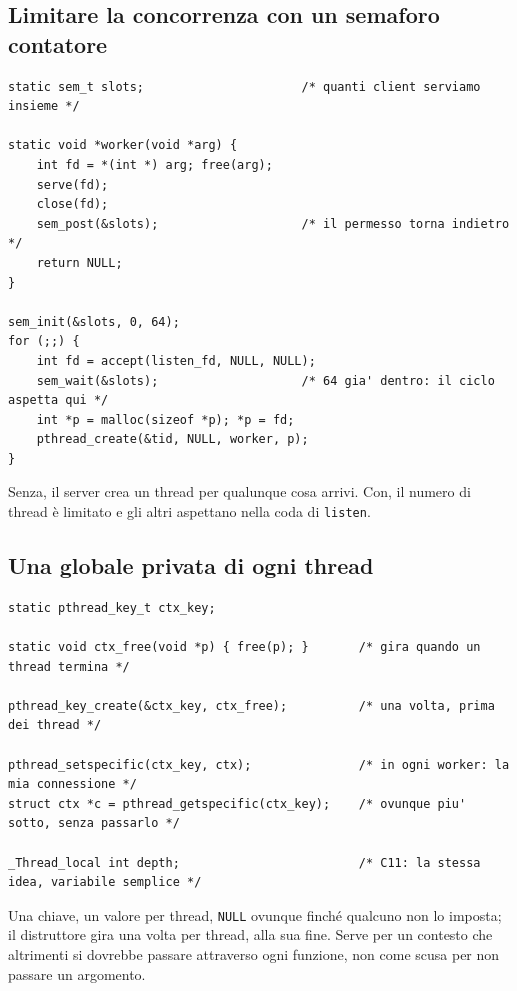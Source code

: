 \subsection{Limitare la concorrenza con un semaforo contatore}

\begin{lstlisting}[language={[POSIX]C}, style=wnumbers, title={Al piu' 64 client serviti insieme}]
static sem_t slots;                      /* quanti client serviamo insieme */

static void *worker(void *arg) {
    int fd = *(int *) arg; free(arg);
    serve(fd);
    close(fd);
    sem_post(&slots);                    /* il permesso torna indietro */
    return NULL;
}

sem_init(&slots, 0, 64);
for (;;) {
    int fd = accept(listen_fd, NULL, NULL);
    sem_wait(&slots);                    /* 64 gia' dentro: il ciclo aspetta qui */
    int *p = malloc(sizeof *p); *p = fd;
    pthread_create(&tid, NULL, worker, p);
}
\end{lstlisting}

Senza, il server crea un thread per qualunque cosa arrivi. Con, il numero di thread è limitato e gli altri aspettano nella
coda di \texttt{listen}.

\subsection{Una globale privata di ogni thread}

\begin{lstlisting}[language={[POSIX]C}, style=wnumbers]
static pthread_key_t ctx_key;

static void ctx_free(void *p) { free(p); }       /* gira quando un thread termina */

pthread_key_create(&ctx_key, ctx_free);          /* una volta, prima dei thread */

pthread_setspecific(ctx_key, ctx);               /* in ogni worker: la mia connessione */
struct ctx *c = pthread_getspecific(ctx_key);    /* ovunque piu' sotto, senza passarlo */

_Thread_local int depth;                         /* C11: la stessa idea, variabile semplice */
\end{lstlisting}

Una chiave, un valore per thread, \texttt{NULL} ovunque finché qualcuno non lo imposta; il distruttore gira una volta per
thread, alla sua fine. Serve per un contesto che altrimenti si dovrebbe passare attraverso ogni funzione, non come scusa per
non passare un argomento.


